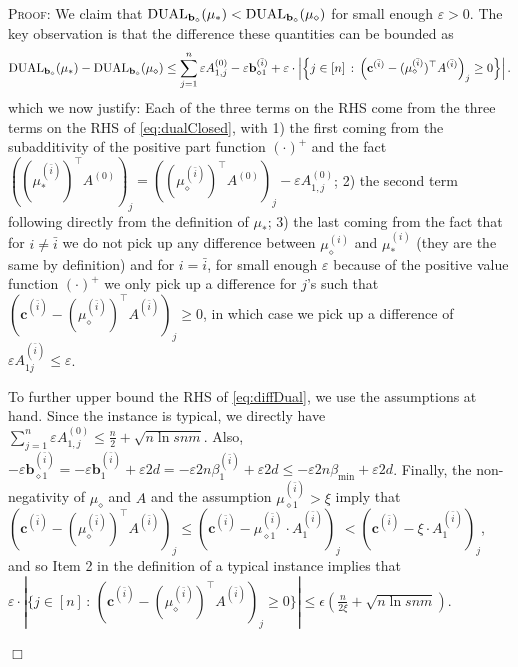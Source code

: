 \documentclass{article}
\newcommand{\e}{\varepsilon}
\newcommand{\cv}[0]{\mathbf{c}}
\newcommand{\bv}[0]{\mathbf{b}}
\newenvironment{proof}[1][]
   {\textsc{Proof#1: }}
   {\hfill$\Box$\smallskip}
\newcommand{\LAG}{\textup{DUAL}}
\begin{document}
\begin{proof}
    We claim that $\LAG_{\bv_{\diamond}}(\mu_*) < \LAG_{\bv_{\diamond}}(\mu_\diamond)$ for small enough $\e > 0$. The key observation is that the difference these quantities can be bounded as
    \begin{align}
    \LAG_{\bv_{\diamond}}(\mu_*) - \LAG_{\bv_{\diamond}}(\mu_\diamond) \le \sum_{j = 1}^n \e A^{(0)}_{1,j} - \e \bv^{(\bar{i})}_{\diamond 1} + \e \cdot \Big| \Big\{ j \in [n] \,:\, \Big(\cv^{(\bar{i})} - (\mu^{(\bar{i})}_{\diamond})^{\top} A^{(\bar{i})}\Big)_j \ge 0 \Big\} \Big|\,.  \label{eq:diffDual}
    \end{align}    
    which we now justify: Each of the three terms on the RHS come from the three terms on the RHS of \eqref{eq:dualClosed}, with 1) the first coming from the subadditivity of the positive part function $(\cdot)^+$ and the fact $((\mu^{(\bar{i})}_{*})^{\top} A^{(0)})_j = ((\mu^{(\bar{i})}_{\diamond})^{\top} A^{(0)})_j - \e A^{(0)}_{1,j}$; 2) the second term following directly from the definition of $\mu_{*}$; 3) the last coming from the fact that for $i \neq \bar{i}$ we do not pick up any difference between $\mu^{(i)}_{\diamond}$ and $\mu^{(i)}_{*}$ (they are the same by definition) and for $i = \bar{i}$, for small enough $\e$ because of the positive value function {$(\cdot)^+$} we only pick up a difference for $j$'s such that $(\cv^{(\bar{i})} - (\mu^{(\bar{i})}_{\diamond})^{\top} A^{(\bar{i})})_j \ge 0$, in which case we pick up a difference of $\e A^{(\bar{i})}_{1j} \le \e$.

    To further upper bound the RHS of \eqref{eq:diffDual}, we use the assumptions at hand. Since the instance is typical, we directly have $\sum_{j = 1}^n \e A^{(0)}_{1,j} \le \frac{n}{2} + \sqrt{n \ln s n m}$. Also, $-\e \bv^{(\bar{i})}_{\diamond 1} = -\e \bv^{(\bar{i})}_{1} + \e 2 d = - \e 2n \beta^{(\bar{i})}_1 + \e 2 d \le -\e 2n \beta_{\min} + \e 2d$. Finally, the non-negativity of $\mu_{\diamond}$ and $A$ and the assumption $\mu^{(\bar{i})}_{\diamond 1} > \xi$ imply that $(\cv^{(\bar{i})} - (\mu^{(\bar{i})}_{\diamond})^{\top} A^{(\bar{i})})_j \le (\cv^{(\bar{i})} - \mu^{(\bar{i})}_{\diamond 1} \cdot A^{(\bar{i})}_1)_j < (\cv^{(\bar{i})} - \xi \cdot A^{(\bar{i})}_1)_j$, and so Item 2 in the definition of a typical instance implies that $\e \cdot | \{ j \in [n] \,:\, (\cv^{(\bar{i})} - (\mu^{(\bar{i})}_{\diamond})^{\top} A^{(\bar{i})})_j \ge 0 \} | \le \epsilon (\frac{n}{2\xi}  + \sqrt{n \ln s n m}) $.


\end{proof}
\end{document}
